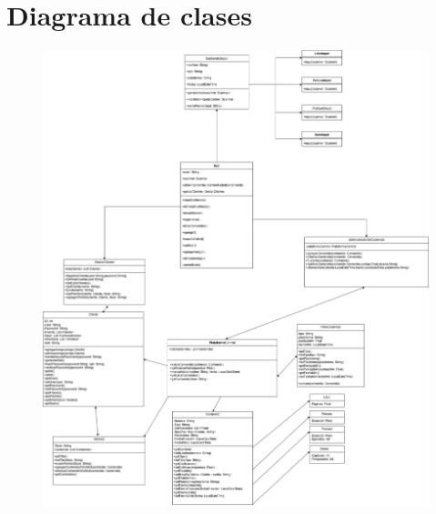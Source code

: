 \section{Diagrama de clases}\label{sec:diagrama-de-clases}
\begin{figure}[h]
    \centering
    \includegraphics[width=1\textwidth]{img/diagrama_clases.png}
\end{figure}

